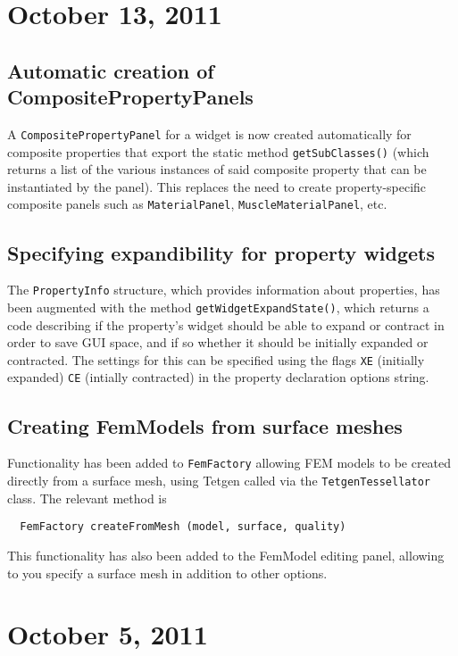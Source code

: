 \documentclass{article}
\begin{document}
\section*{October 13, 2011}

\subsection*{Automatic creation of CompositePropertyPanels}

A {\tt CompositePropertyPanel} for a widget is now created automatically
for composite properties that export the static method
{\tt getSubClasses()} (which returns a list of the various instances of
said composite property that can be instantiated by the panel). This
replaces the need to create property-specific composite panels such as
{\tt MaterialPanel}, {\tt MuscleMaterialPanel}, etc.

\subsection*{Specifying expandibility for property widgets}

The {\tt PropertyInfo} structure, which provides information about
properties, has been augmented with the method
{\tt getWidget\-ExpandState()}, which returns a code describing if the
property's widget should be able to expand or contract in order to
save GUI space, and if so whether it should be initially expanded or
contracted. The settings for this can be specified using the flags
{\tt XE} (initially expanded) {\tt CE} (intially contracted) in the property
declaration options string.

\subsection*{Creating FemModels from surface meshes}

Functionality has been added to {\tt FemFactory} allowing FEM models to be
created directly from a surface mesh, using Tetgen called via the
{\tt TetgenTessellator} class. The relevant method is

\begin{verbatim}
  FemFactory createFromMesh (model, surface, quality)
\end{verbatim}

This functionality has also been added to the FemModel editing panel,
allowing to you specify a surface mesh in addition to other options.

\section*{October 5, 2011}
\end{document}
